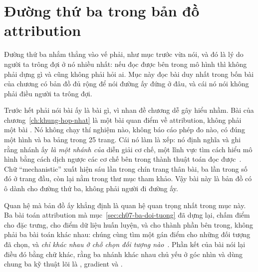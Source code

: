\section{Đường thứ ba trong bản đồ attribution}
\label{sec:ch16-duong-thu-ba}

%
Đường thứ ba nhắm thẳng vào vế phải, như mục trước vừa nói, và đó là lý do người
ta trông đợi ở nó nhiều nhất: nếu đọc được bên trong mô hình thì không phải dựng
gì và cũng không phải hỏi ai. Mục này đọc bài duy nhất trong bốn bài của chương
có bản đồ đủ rộng để nói đường ấy đứng ở đâu, và cái nó nói không phải điều
người ta trông đợi.

%
Trước hết phải nói bài ấy là bài gì, vì nhan đề chương dễ gây hiểu nhầm. Bài của
chương~\ref{ch:khung-hop-nhat} là một bài quan điểm về attribution, không phải
một bài . Nó không chạy thí
nghiệm nào, không báo cáo phép đo nào, có đúng một hình và ba bảng trong 25
trang. Cái nó làm là xếp: nó định nghĩa
 và ghi rằng nhánh ấy
\emph{là một nhánh của} diễn giải cơ chế, một lĩnh vực tìm cách hiểu mô hình
bằng cách dịch ngược các cơ chế bên trong thành thuật toán đọc
được~\autocite{p18unified}. Chữ \enquote{mechanistic} xuất hiện sáu lần trong
chín trang thân bài, ba lần trong số đó ở trang đầu, còn lại nằm trong thư mục
tham khảo. Vậy bài này là bản đồ có ô dành cho đường thứ ba, không phải người đi
đường ấy.

%
Quan hệ mà bản đồ ấy khẳng định là quan hệ quan trọng nhất trong mục này. Ba bài
toán attribution mà mục~\ref{sec:ch07-ba-doi-tuong} đã dựng lại, chấm điểm cho
đặc trưng, cho điểm dữ liệu huấn luyện, và cho thành phần bên trong, không phải
ba bài toán khác nhau: chúng cùng tìm một
 gán điểm cho những đối
tượng đã chọn, và \emph{chỉ khác nhau ở chỗ chọn đối tượng
nào}~\autocite{p18unified}. Phần kết của bài nói lại điều đó bằng chữ khác, rằng
ba nhánh khác nhau chủ yếu ở góc nhìn và dùng chung ba kỹ thuật lõi là
, gradient và
.

